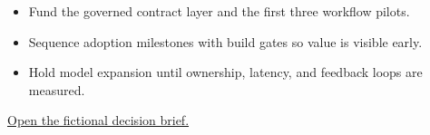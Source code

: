 \begin{itemize}
  \item Fund the governed contract layer and the first three workflow pilots.
  \item Sequence adoption milestones with build gates so value is visible early.
  \item Hold model expansion until ownership, latency, and feedback loops are measured.
\end{itemize}

\vspace{2mm}
\href{https://example.com/nexagrid-brief}{Open the fictional decision brief.}
